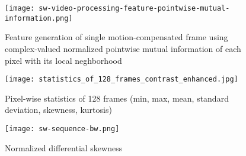 \documentclass[../main.tex]{subfiles}
\begin{document}
\begin{figure}[htb]\centering
	\texttt{[image: sw-video-processing-feature-pointwise-mutual-information.png]}
	\caption{Feature generation of single motion-compensated frame using complex-valued normalized pointwise mutual information of each pixel with its local neghborhood}
\end{figure}



\begin{figure}[htb]\centering
	\texttt{[image: statistics\_of\_128\_frames\_contrast\_enhanced.jpg]}
	\caption{Pixel-wise statistics of 128 frames (min, max, mean, standard deviation, skewness, kurtosis)}
\end{figure}


\begin{figure}[htb]\centering
	\texttt{[image: sw-sequence-bw.png]}
	\caption{Normalized differential skewness}
\end{figure}

\clearpage
\end{document}
